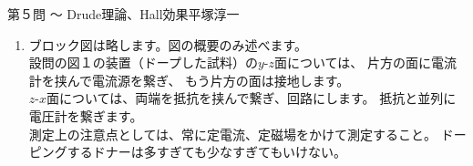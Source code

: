 \begin{answer}{第５問 〜 Drude理論、Hall効果}{平塚淳一}
\begin{enumerate}
\begin{equation}
  \log(n) \propto -\frac{1}{T}
  \end{equation}
  中間領域（出払い領域)\\
  ドナーが全て伝導帯へ励起して自由電子として振る舞う。価電子帯からの励起はない領域。
  \begin{equation}
  \log(n) \sim \mathrm{const}.
  \end{equation}
  低温領域（〜凍結領域）\\
  十分多数のドナーがイオン化していない（励起していない）領域。
  \begin{equation}
  \log(n) \propto -\frac{1}{T}
  \end{equation}
  図は略します。横軸は $T$ の逆数、縦軸は $\log$ スケールで描くと良いと思います。
  高温領域の傾きは低温領域の傾きよりも急です。
  詳しくは固体物理の教科書を参照（H.イバッハ、H.リュート著「固体物理学」１２章など）。
  何故か$n$の表式を導くヒントが何も与えられていないので、
  これくらいの特性は覚えていろということでしょうか。
\item ブロック図は略します。図の概要のみ述べます。\\
  設問の図１の装置（ドープした試料）の$y$-$z$面については、
  片方の面に電流計を挟んで電流源を繋ぎ、
  もう片方の面は接地します。\\
  $z$-$x$面については、両端を抵抗を挟んで繋ぎ、回路にします。
  抵抗と並列に電圧計を繋ぎます。\\
  測定上の注意点としては、常に定電流、定磁場をかけて測定すること。
  ドーピングするドナーは多すぎても少なすぎてもいけない。
\end{enumerate}
\end{answer}
